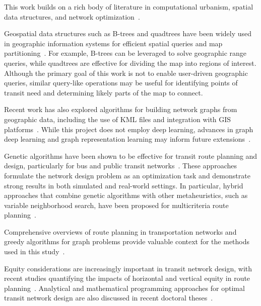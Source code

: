 \documentclass[manuscript]{acmart}
\begin{document}
This work builds on a rich body of literature in computational urbanism, spatial data structures, and network optimization~\cite{bib:bast2016route, bib:chien2001genetic, bib:dib2017ga, bib:silverman1986density, bib:samet1984quadtrees}. 

Geospatial data structures such as B-trees and quadtrees have been widely used in geographic information systems for efficient spatial queries and map partitioning~\cite{bib:libera1986btrees,bib:samet1984gis}. For example, B-trees can be leveraged to solve geographic range queries, while quadtrees are effective for dividing the map into regions of interest. Although the primary goal of this work is not to enable user-driven geographic queries, similar query-like operations may be useful for identifying points of transit need and determining likely parts of the map to connect.

Recent work has also explored algorithms for building network graphs from geographic data, including the use of KML files and integration with GIS platforms~\cite{bib:toman2014graph}. While this project does not employ deep learning, advances in graph deep learning and graph representation learning may inform future extensions~\cite{bib:georgousis2021graph,bib:twaty2019graphopt,bib:liu2023smef}.

Genetic algorithms have been shown to be effective for transit route planning and design, particularly for bus and public transit networks~\cite{bib:chien2001ga,bib:dib2017ga}. These approaches formulate the network design problem as an optimization task and demonstrate strong results in both simulated and real-world settings. In particular, hybrid approaches that combine genetic algorithms with other metaheuristics, such as variable neighborhood search, have been proposed for multicriteria route planning~\cite{bib:dib2017ga}.

Comprehensive overviews of route planning in transportation networks and greedy algorithms for graph problems provide valuable context for the methods used in this study~\cite{bib:bast2016route,bib:davis2007greedy}.

Equity considerations are increasingly important in transit network design, with recent studies quantifying the impacts of horizontal and vertical equity in route planning~\cite{bib:camporeale2016equity}. Analytical and mathematical programming approaches for optimal transit network design are also discussed in recent doctoral theses~\cite{bib:fan2004optimal,bib:mahmoudi2024optimal}.
\end{document}
